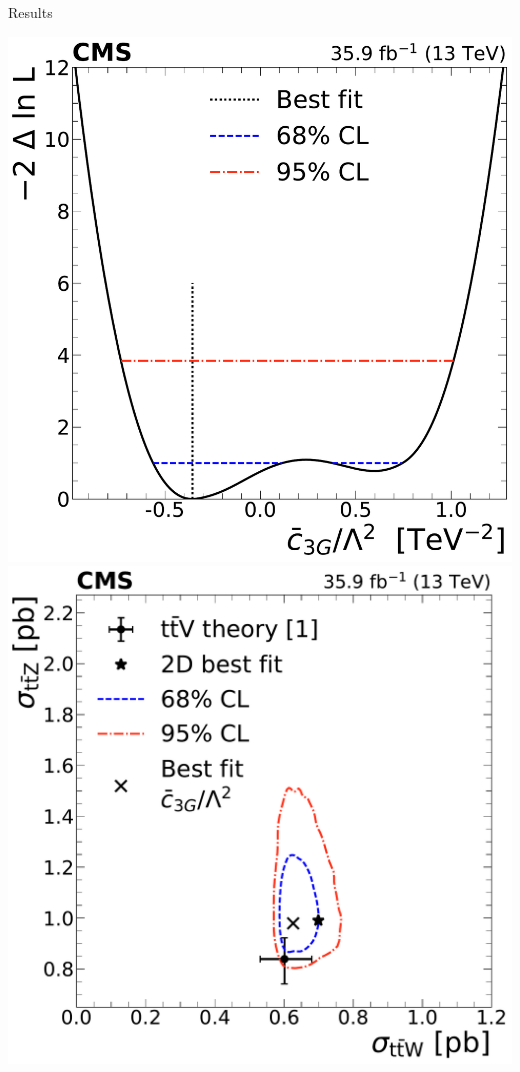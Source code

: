 \documentclass[professionalfont,fleqn]{beamer}
\begin{document}
\begin{frame}{Results}
\begin{overlayarea}{\textwidth}{7cm}
{{      \includegraphics[height=\textheight]{figures/thirteen-TeV/NP/nll/c3G}\hspace{5mm}
      \includegraphics[height=\textheight]{figures/thirteen-TeV/NP/2D/ttZ_ttW_2D_1D_c3G}
}}
\end{overlayarea}
\end{frame}
\end{document}
